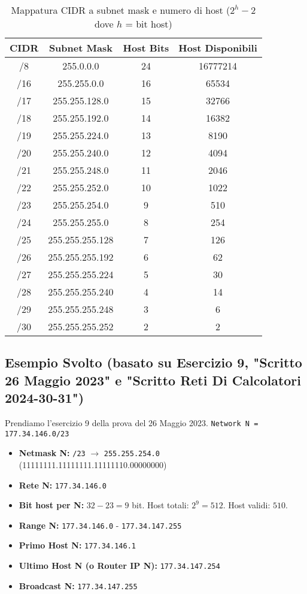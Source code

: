 \begin{table}[h]
\centering
\begin{tabular}{|c|c|c|c|}
\hline
\rowcolor{bg_custom}
\textbf{CIDR} & \textbf{Subnet Mask} & \textbf{Host Bits} & \textbf{Host Disponibili} \\
\hline
/8  & 255.0.0.0 & 24 & 16777214 \\
/16 & 255.255.0.0 & 16 & 65534 \\
/17 & 255.255.128.0 & 15 & 32766 \\
/18 & 255.255.192.0 & 14 & 16382 \\
/19 & 255.255.224.0 & 13 & 8190 \\
/20 & 255.255.240.0 & 12 & 4094 \\
/21 & 255.255.248.0 & 11 & 2046 \\
/22 & 255.255.252.0 & 10 & 1022 \\
/23 & 255.255.254.0 & 9  & 510 \\
/24 & 255.255.255.0 & 8  & 254 \\
/25 & 255.255.255.128 & 7  & 126 \\
/26 & 255.255.255.192 & 6  & 62 \\
/27 & 255.255.255.224 & 5  & 30 \\
/28 & 255.255.255.240 & 4  & 14 \\
/29 & 255.255.255.248 & 3  & 6 \\
/30 & 255.255.255.252 & 2  & 2 \\
\hline
\end{tabular}
\caption{Mappatura CIDR a subnet mask e numero di host ($2^h - 2$ dove $h$ = bit host)}
\end{table}

\subsection{Esempio Svolto (basato su Esercizio 9, "Scritto 26 Maggio 2023" e "Scritto Reti Di Calcolatori 2024-30-31")}
Prendiamo l'esercizio 9 della prova del 26 Maggio 2023.
\texttt{Network N = 177.34.146.0/23}
\begin{itemize}
    \item \textbf{Netmask N:} \texttt{/23} $\to$ \texttt{255.255.254.0} (11111111.11111111.11111110.00000000)
    \item \textbf{Rete N:} \texttt{177.34.146.0}
    \item \textbf{Bit host per N:} $32 - 23 = 9$ bit. Host totali: $2^9 = 512$. Host validi: $510$.
    \item \textbf{Range N:} \texttt{177.34.146.0} - \texttt{177.34.147.255}
    \item \textbf{Primo Host N:} \texttt{177.34.146.1}
    \item \textbf{Ultimo Host N (o Router IP N):} \texttt{177.34.147.254}
    \item \textbf{Broadcast N:} \texttt{177.34.147.255}
\end{itemize}

